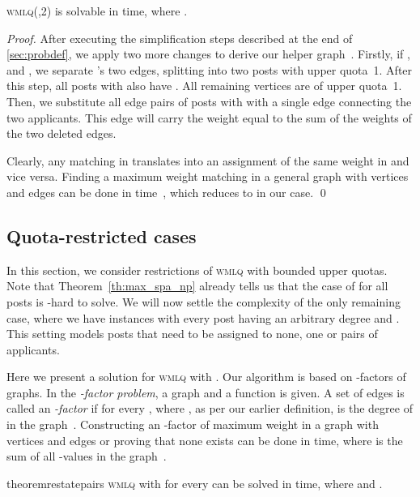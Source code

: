 \documentclass{llncs}
\begin{document}
\begin{theorem}
\label{th:infty_2}
	\textsc{wmlq(,2)} is solvable in  time, where .
\end{theorem}

\begin{proof}
	After executing the simplification steps described at the end of \cref{sec:probdef}, we apply two more changes to derive our helper graph~. Firstly, if ,  and , we separate 's two edges, splitting  into two posts with upper quota~1. After this step, all posts with  also have . All remaining vertices are of upper quota~1. Then, we substitute all edge pairs of posts with  with a single edge connecting the two applicants. This edge will carry the weight equal to the sum of the weights of the two deleted edges.
    
    Clearly, any matching in  translates into an assignment of the same weight in  and vice versa. Finding a maximum weight matching in a general graph with  vertices and  edges can be done in  time~\cite{Gab90}, which reduces to  in our case. \qed
\end{proof}

\subsection{Quota-restricted cases}
\label{sec:quotarest}
In this section, we consider restrictions of \textsc{wmlq} with bounded upper quotas. Note that Theorem~\ref{th:max_spa_np} already tells us that the case of  for all posts  is -hard to solve. We will now settle the complexity of the only remaining case, where we have instances with every post  having an arbitrary degree and . This setting models posts that need to be assigned  to none, one or pairs of applicants.



Here we present a solution for \textsc{wmlq} with . Our algorithm is based on -factors of graphs. In the {\em -factor problem}, a graph  and a function  is given. A set of edges  is called an \emph{-factor} if  for every , where , as per our earlier definition, is the degree of  in the graph~. Constructing an -factor of maximum weight in a graph with  vertices and  edges or proving that none exists can be done in  time, where  is the sum of all -values in the graph~\cite{Gab83,Gab90}.

\begin{restatable}{theorem}{restatepairs}
\label{th:u2}
	\textsc{wmlq} with  for every  can be solved in  time, where  and .
\end{restatable}
\end{document}
